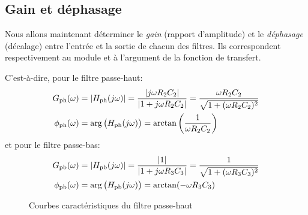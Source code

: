 \subsection{Gain et déphasage}

Nous allons maintenant déterminer
le \emph{gain} (rapport d'amplitude) et le  \emph{déphasage} (décalage)
entre l'entrée et la sortie de chacun des filtres.
Ils correspondent respectivement au module et à l'argument de la fonction de
transfert.

C'est-à-dire, pour le filtre passe-haut:
\begin{align}
    G_{\mathrm{ph}}(\omega) &= |H_{\mathrm{ph}}(j\omega)|
    = \frac{|j\omega R_2C_2|}{|1 + j\omega R_2C_2|}
    = \frac{\omega R_2C_2}{\sqrt{1+(\omega R_2C_2)^2}}\\
    \phi_{\mathrm{ph}}(\omega) &= \arg\big(H_{\mathrm{ph}}(j\omega)\big)
    = \arctan\left(\frac{1}{\omega R_2C_2}\right)
\end{align}
et pour le filtre passe-bas:
\begin{align}
    G_{\mathrm{pb}}(\omega) &= |H_{\mathrm{pb}}(j\omega)|
    = \frac{|1|}{|1 + j\omega R_3C_3|}
    = \frac{1}{\sqrt{1+(\omega R_3C_3)^2}}\\
    \phi_{\mathrm{pb}}(\omega) &= \arg\big(H_{\mathrm{pb}}(j\omega)\big)
    = \arctan(-\omega R_3C_3)
\end{align}

\begin{figure}[h!]
    \centering
    \qquad
    \caption{Courbes caractéristiques du filtre passe-haut}
    \label{fig:graphes-ph}
\end{figure}

